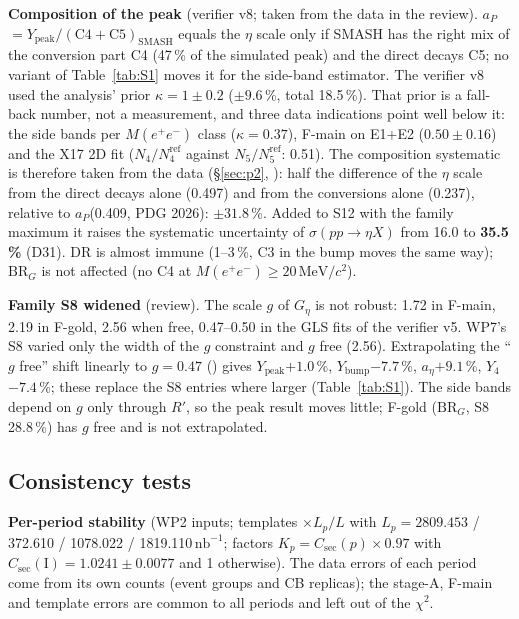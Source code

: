 \documentclass[11pt,a4paper]{article}
\newcommand{\Mee}{\ensuremath{M(e^{+}e^{-})}\xspace}
\newcommand{\nbinv}{\ensuremath{\mathrm{nb}^{-1}}\xspace}
\newcommand{\MeVcc}{\ensuremath{\mathrm{MeV}/c^{2}}\xspace}
\newcommand{\code}[1]{\texttt{\detokenize{#1}}}
\newcommand{\aEta}{\ensuremath{a_\eta}\xspace}
\newcommand{\aP}{\ensuremath{a_P}\xspace}
\newcommand{\aB}{\ensuremath{a_B(E2)}\xspace}%
\newcommand{\Ybump}{\ensuremath{Y_{\mathrm{bump}}}\xspace}
\newcommand{\Ypeak}{\ensuremath{Y_{\mathrm{peak}}}\xspace}
\newcommand{\Csec}{\ensuremath{C_{\mathrm{sec}}}\xspace}
\newcommand{\feta}{\ensuremath{f_\eta}\xspace}
\newcommand{\BRG}{\ensuremath{\mathrm{BR}_G}\xspace}
\newcommand{\sigeta}{\ensuremath{\sigma(pp\to\eta X)}\xspace}
\newcommand{\Geta}{\ensuremath{G_\eta}\xspace}
\newcommand{\tabin}[1]{}
\begin{document}
\textbf{Composition of the peak} (verifier v8; taken from the data in the review). \aP $=\Ypeak/(\mathrm{C4}+\mathrm{C5})_{\mathrm{SMASH}}$ equals
the $\eta$ scale only if SMASH has the right mix of the conversion part C4 (47\,\% of the simulated peak) and the direct decays C5; no variant
of Table~\ref{tab:S1} moves it for the side-band estimator. The verifier v8 used the analysis' prior $\kappa=1\pm0.2$ ($\pm9.6$\,\%, total
18.5\,\%). That prior is a fall-back number, not a measurement, and three data indications point well below it: the side bands per \Mee class
($\kappa=0.37$), F-main on E1+E2 ($0.50\pm0.16$) and the X17 2D fit ($N_4/N_4^{\mathrm{ref}}$ against $N_5/N_5^{\mathrm{ref}}$: 0.51). The
composition systematic is therefore taken from the data (\S\ref{sec:p2}, \code{fix_numbers.py}): half the difference of the $\eta$ scale
from the direct decays alone (0.497) and from the conversions alone (0.237), relative to \aP (0.409, PDG 2026): $\pm31.8$\,\%. Added to S12 with
the family maximum it raises the systematic uncertainty of \sigeta from 16.0 to \textbf{35.5\,\%} (D31). DR is almost immune (1--3\,\%, C3 in
the bump moves the same way); \BRG is not affected (no C4 at \Mee$\ge20$\,\MeVcc).

\textbf{Family S8 widened} (review). The scale $g$ of \Geta is not robust: 1.72 in F-main, 2.19 in F-gold, 2.56 when free, 0.47--0.50 in the GLS
fits of the verifier v5. WP7's S8 varied only the width of the $g$ constraint and $g$ free (2.56). Extrapolating the ``$g$ free'' shift
linearly to $g=0.47$ (\code{fix_numbers.py}) gives \Ypeak $+1.0$\,\%, \Ybump $-7.7$\,\%, \aEta $+9.1$\,\%, $Y_4$ $-7.4$\,\%; these replace the
S8 entries where larger (Table~\ref{tab:S1}). The side bands depend on $g$ only through $R'$, so the peak result moves little; F-gold
(\BRG, S8 28.8\,\%) has $g$ free and is not extrapolated.

\subsection{Consistency tests}
\label{sec:periods}
\textbf{Per-period stability} (WP2 inputs; templates $\times L_p/L$ with $L_p=2809.453$ / 372.610 / 1078.022 / 1819.110\,\nbinv; factors
$K_p=\Csec(p)\times0.97$ with $\Csec(\mathrm{I})=1.0241\pm0.0077$ and 1 otherwise). The data errors of each period come from its own counts (event
groups and CB replicas); the stage-A, F-main and template errors are common to all periods and left out of the $\chi^2$.

\begin{table}[H]
\centering
\caption{Per-period stability test: \aEta (F-main type: background shape fixed, one free scale, $\kappa$ and $g$ fixed), \aP (peak side bands),
\aB (B4), DR$_F$ and DR per period; raw, $\times K_p=\Csec(p)(1-\feta)$, and $\times$ the old $K_p=\Csec(1-f_{\mathrm{win},p})$ (superseded by
Amendment~1, IIA--IIB correlated); $\chi^2$ against the weighted mean. All pass ($p>0.01$). Source: WP7 (\code{wp7_periods.txt}). Fall-backs: E1 dropped ($\kappa=1\pm0.2$); template fits demoted to cross-checks.}
\label{tab:periods}
\small
\resizebox{\textwidth}{!}{\tabin{fix_periods.tex}}
\end{table}
\end{document}
